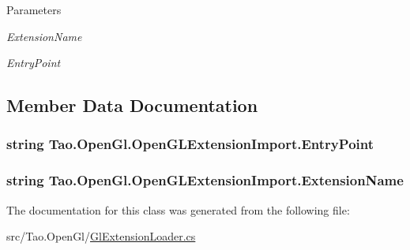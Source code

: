 \begin{DoxyParams}{Parameters}
\item[{\em ExtensionName}]\item[{\em EntryPoint}]\end{DoxyParams}


\subsection{Member Data Documentation}
\hypertarget{class_tao_1_1_open_gl_1_1_open_g_l_extension_import_a16dc5f6496b1256bed80f1165a0688ce}{
\subsubsection[{EntryPoint}]{\setlength{\rightskip}{0pt plus 5cm}string {\bf Tao.OpenGl.OpenGLExtensionImport.EntryPoint}}}
\label{class_tao_1_1_open_gl_1_1_open_g_l_extension_import_a16dc5f6496b1256bed80f1165a0688ce}
\hypertarget{class_tao_1_1_open_gl_1_1_open_g_l_extension_import_afda6239f1572a770d69c50da930a9653}{
\subsubsection[{ExtensionName}]{\setlength{\rightskip}{0pt plus 5cm}string {\bf Tao.OpenGl.OpenGLExtensionImport.ExtensionName}}}
\label{class_tao_1_1_open_gl_1_1_open_g_l_extension_import_afda6239f1572a770d69c50da930a9653}


The documentation for this class was generated from the following file:\begin{DoxyCompactItemize}
\item 
src/Tao.OpenGl/\hyperlink{_gl_extension_loader_8cs}{GlExtensionLoader.cs}\end{DoxyCompactItemize}
